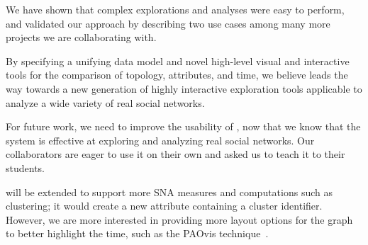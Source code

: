 We have shown that complex explorations and analyses were easy to perform, and validated our approach by describing two use cases among many more projects we are collaborating with.

By specifying a unifying data model and novel high-level visual and interactive tools for the comparison of topology, attributes, and time, we believe \name leads the way towards a new generation of highly interactive exploration tools applicable to analyze a wide variety of real social networks.

For future work, we need to improve the usability of \name, now that we know that the system is effective at exploring and analyzing real social networks. Our collaborators are eager to use it on their own and asked us to teach it to their students.

\name will be extended to support more SNA measures and computations such as clustering; it would create a new attribute containing a cluster identifier. However, we are more interested in providing more layout options for the graph to better highlight the time, such as the PAOvis technique~\cite{valdivia:hal-02264960}.
